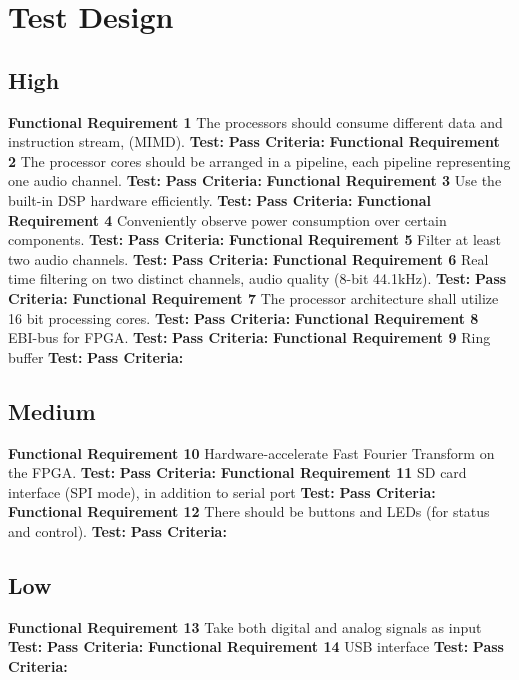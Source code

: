 \section{Test Design}

\subsection{High}
\textbf{Functional Requirement 1}
The processors should consume different data and instruction stream, (MIMD).
\textbf{Test:}
\textbf{Pass Criteria:}
\textbf{Functional Requirement 2}
The processor cores should be arranged in a pipeline, each pipeline representing one audio channel.
\textbf{Test:}
\textbf{Pass Criteria:}
\textbf{Functional Requirement 3}
Use the built-in DSP hardware efficiently.
\textbf{Test:}
\textbf{Pass Criteria:}
\textbf{Functional Requirement 4}
Conveniently observe power consumption over certain components.
\textbf{Test:}
\textbf{Pass Criteria:}
\textbf{Functional Requirement 5}
Filter at least two audio channels.
\textbf{Test:}
\textbf{Pass Criteria:}
\textbf{Functional Requirement 6}
Real time filtering on two distinct channels, audio quality (8-bit 44.1kHz).
\textbf{Test:}
\textbf{Pass Criteria:}
\textbf{Functional Requirement 7}
The processor architecture shall utilize 16 bit processing cores.
\textbf{Test:}
\textbf{Pass Criteria:}
\textbf{Functional Requirement 8}
EBI-bus for FPGA.
\textbf{Test:}
\textbf{Pass Criteria:}
\textbf{Functional Requirement 9}
Ring buffer
\textbf{Test:}
\textbf{Pass Criteria:}


\subsection{Medium}
\textbf{Functional Requirement 10}
Hardware-accelerate Fast Fourier Transform on the FPGA.
\textbf{Test:}
\textbf{Pass Criteria:}
\textbf{Functional Requirement 11}
SD card interface (SPI mode), in addition to serial port
\textbf{Test:}
\textbf{Pass Criteria:}
\textbf{Functional Requirement 12}
There should be buttons and LEDs (for status and control).
\textbf{Test:}
\textbf{Pass Criteria:}


\subsection{Low}
\textbf{Functional Requirement 13}
Take both digital and analog signals as input
\textbf{Test:}
\textbf{Pass Criteria:}
\textbf{Functional Requirement 14}
USB interface
\textbf{Test:}
\textbf{Pass Criteria:}

